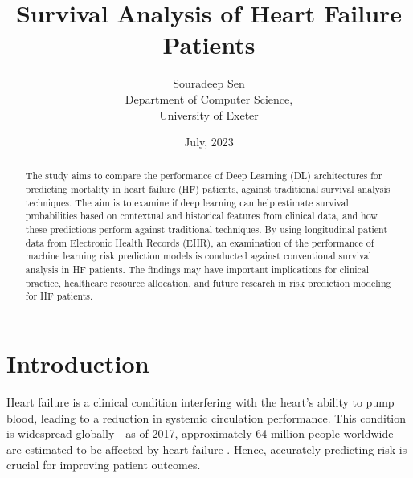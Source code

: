 \documentclass[%
 twocolumn,
 reprint,
 amsmath,amssymb,
 aps,nofootinbib
]{revtex4-2}
\begin{document}


\title{Survival Analysis of Heart Failure Patients}%
\author{Souradeep Sen \\
	 \small Department of Computer Science, \\ 
	 \small University of Exeter
	}

\date{July, 2023}%



\begin{abstract}
The study aims to compare the performance of Deep Learning (DL) architectures for predicting mortality in heart failure (HF) patients, against traditional survival analysis techniques. The aim is to examine if deep learning can help estimate survival probabilities based on contextual and historical features from clinical data, and how these predictions perform against traditional techniques. By using longitudinal patient data from Electronic Health Records (EHR), an examination of the performance of machine learning risk prediction models is conducted against conventional survival analysis in HF patients. The findings may have important implications for clinical practice, healthcare resource allocation, and future research in risk prediction modeling for HF patients.
\end{abstract}


\maketitle





\section{\label{intro}Introduction}
Heart failure is a clinical condition interfering with the heart's ability to pump blood, leading to a reduction in systemic circulation performance. This condition is widespread globally - as of 2017, approximately 64 million people worldwide are estimated to be affected by heart failure \cite{hf_prevalence}. Hence, accurately predicting risk is crucial for improving patient outcomes.\\
\end{document}
